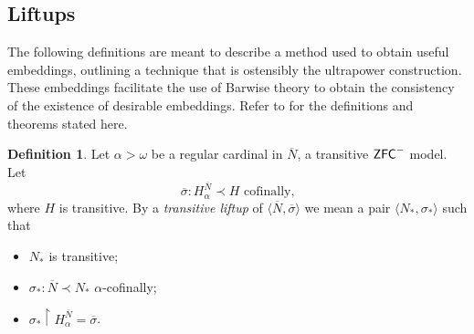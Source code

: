 \documentclass{amsart}
\theoremstyle{definition}
\newtheorem{definition}[theorem]{Definition}
\theoremstyle{remark}
\newcommand{\N}{{\overline{N}}}
\newcommand{\ZFC}{\textup{\ensuremath{\textsf{ZFC}}}}
\begin{document}
\subsection{Liftups}
\label{subsec:Liftups}
The following definitions are meant to describe a method used to obtain useful embeddings, outlining a technique that is ostensibly the ultrapower construction. These embeddings facilitate the use of Barwise theory to obtain the consistency of the existence of desirable embeddings. Refer to \cite[Chapter 1]{Jensen:2012fr} for the definitions and theorems stated here.
	
\begin{definition} Let $\alpha > \omega$ be a regular cardinal in $\N$, a transitive $\ZFC^-$ model. Let 
	$$\overline \sigma: H^{\N}_\alpha \prec H \text{ cofinally,}$$ where $H$ is transitive. By a \emph{transitive liftup} of $\langle \N, \overline \sigma \rangle$ we mean a pair $\langle N_* , \sigma_* \rangle$ such that 
\begin{itemize} 
	\item $N_*$ is transitive;
	\item $\sigma_*:\N \prec N_*$ $\alpha$-cofinally;
	\item $\sigma_* \upharpoonright H_{\alpha}^{\N}= \overline \sigma$. \qedhere
\end{itemize}	
\end{definition}
\end{document}
